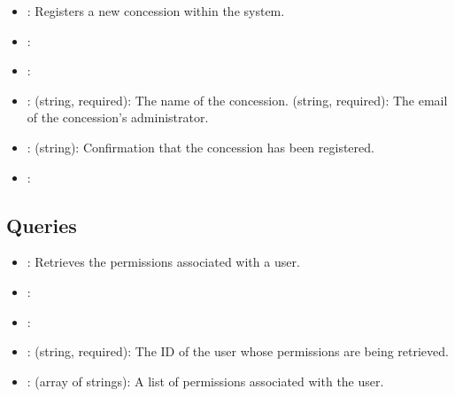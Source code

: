 \documentclass[letterpaper,10pt,english]{sphinxmanual}
\begin{document}
\sphinxAtStartPar
{}
\begin{itemize}
\item {} 
\sphinxAtStartPar
{}: Registers a new concession within the system.

\item {} 
\sphinxAtStartPar
{}: 

\item {} 
\sphinxAtStartPar
{}: 

\item {} 
\sphinxAtStartPar
{}:
\sphinxhyphen{}  (string, required): The name of the concession.
\sphinxhyphen{}  (string, required): The email of the concession’s administrator.

\item {} 
\sphinxAtStartPar
{}:
\sphinxhyphen{}  (string): Confirmation that the concession has been registered.

\item {} 
\sphinxAtStartPar
{}: 

\end{itemize}


\subsection{Queries}
\label{\detokenize{administration_concession_system/authorization_service:queries}}
\sphinxAtStartPar
{}
\begin{itemize}
\item {} 
\sphinxAtStartPar
{}: Retrieves the permissions associated with a user.

\item {} 
\sphinxAtStartPar
{}: 

\item {} 
\sphinxAtStartPar
{}: 

\item {} 
\sphinxAtStartPar
{}:
\sphinxhyphen{}  (string, required): The ID of the user whose permissions are being retrieved.

\item {} 
\sphinxAtStartPar
{}:
\sphinxhyphen{}  (array of strings): A list of permissions associated with the user.

\end{itemize}
\end{document}
